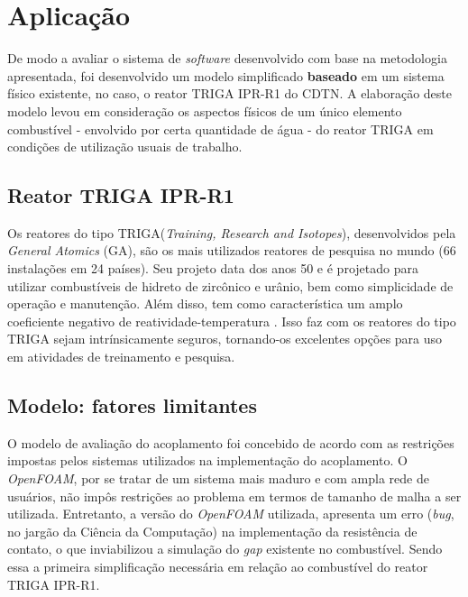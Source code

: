 \chapter{Aplicação}
\label{chap:aplicacao}

De modo a avaliar o sistema de \textit{software} desenvolvido com base na metodologia apresentada, 
foi desenvolvido um modelo simplificado \textbf{baseado} em um sistema físico existente, no caso,
o reator TRIGA IPR-R1 do CDTN. A elaboração deste modelo levou em consideração os aspectos físicos
de um único elemento combustível - envolvido por certa quantidade de água - do reator TRIGA
em condições de utilização usuais de trabalho.

\section{Reator TRIGA IPR-R1}
\label{sec:triga}


Os reatores do tipo TRIGA\textregistered (\textit{Training, Research and Isotopes}),
desenvolvidos pela \textit{General Atomics} (GA), são os mais utilizados
reatores de pesquisa no mundo (66 instalações em 24 países). Seu projeto data dos anos 50 e é
projetado para utilizar combustíveis de hidreto de zircônico e urânio, bem como simplicidade
de operação e manutenção. Além disso, tem como característica um amplo coeficiente negativo
de reatividade-temperatura \cite{Veloso2005}. Isso faz com os reatores do tipo TRIGA sejam
intrínsicamente seguros, tornando-os excelentes opções para uso em atividades de treinamento
e pesquisa.



\section{Modelo: fatores limitantes}
\label{sec:lim}

O modelo de avaliação do acoplamento foi concebido de acordo com as restrições impostas pelos sistemas
utilizados na implementação do acoplamento. O \textit{OpenFOAM}, por se tratar de um sistema mais maduro
e com ampla rede de usuários, não impôs
restrições ao problema em termos de tamanho de malha a ser utilizada. Entretanto, a versão
do \textit{OpenFOAM} utilizada,
apresenta um erro (\textit{bug}, no jargão da Ciência da Computação) na implementação da resistência
de contato, o que inviabilizou a simulação do \textit{gap} existente no combustível. Sendo essa a
primeira simplificação necessária em relação ao combustível do reator TRIGA IPR-R1.

